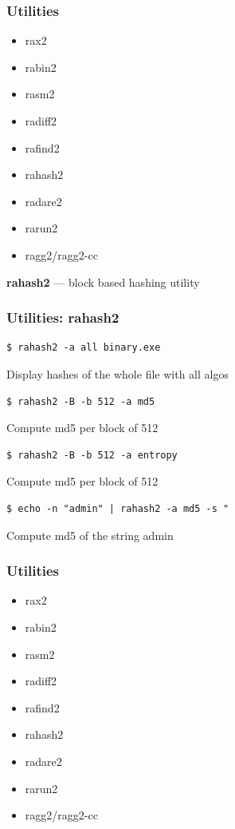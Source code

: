\documentclass[10pt, compress]{beamer}
\begin{document}
\begin{frame}[fragile]
  \frametitle{Utilities}
     \begin{itemize}
        \item rax2
        \item rabin2
        \item rasm2
        \item radiff2
        \item rafind2
        \item \alert{rahash2}
        \item radare2
        \item rarun2
        \item ragg2/ragg2-cc
      \end{itemize}
\end{frame}

\begin{frame}[fragile]
  \center\textbf{rahash2} — block based hashing utility
  \noindent\makebox[\linewidth]{\rule{\paperwidth}{0.4pt}}
  \frametitle{Utilities: rahash2}
  \begin{verbatim}$ rahash2 -a all binary.exe\end{verbatim}
  \alert{Display hashes of the whole file with all algos}
  \begin{verbatim}$ rahash2 -B -b 512 -a md5\end{verbatim}
  \alert{Compute md5 per block of 512}
  \begin{verbatim}$ rahash2 -B -b 512 -a entropy\end{verbatim}
  \alert{Compute md5 per block of 512}
  \begin{verbatim}$ echo -n "admin" | rahash2 -a md5 -s "\end{verbatim}
  \alert{Compute md5 of the string admin}

\end{frame}

\begin{frame}[fragile]
  \frametitle{Utilities}
     \begin{itemize}
        \item rax2
        \item rabin2
        \item rasm2
        \item radiff2
        \item rafind2
        \item rahash2
        \item \alert{radare2}
        \item rarun2
        \item ragg2/ragg2-cc
      \end{itemize}
\end{frame}
\end{document}
